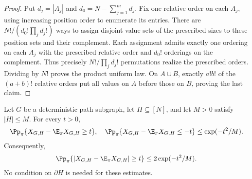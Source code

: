 \begin{proof}
Put \(d_j=|A_j|\) and \(d_0=N-\sum_{j=1}^m d_j\).  Fix one
relative order on each \(A_j\), using increasing position order to
enumerate its entries.  There are
\(N!/(d_0!\prod_jd_j!)\) ways to assign disjoint value sets of the
prescribed sizes to these position sets and their complement.  Each
assignment admits exactly one ordering on each \(A_j\) with the
prescribed relative order and \(d_0!\) orderings on the complement.
Thus precisely \(N!/\prod_jd_j!\) permutations realize the prescribed
orders.  Dividing by \(N!\) proves the product uniform law.  On
\(A\cup B\), exactly \(a!b!\) of the \((a+b)!\) relative orders
put all values on \(A\) before those on \(B\), proving the last claim.
\end{proof}

\begin{lemma}
\label{lem:permutation-bd}
Let \(G\) be a deterministic path subgraph, let \(H\subseteq[N]\),
and let \(M>0\) satisfy \(|H|\le M\).  For every \(t>0\),
\begin{equation}
\label{eq:component-ascent-one-sided}
  \Pp_\pi\{X_{G,H}-\E_\pi X_{G,H}\ge t\},\quad
  \Pp_\pi\{X_{G,H}-\E_\pi X_{G,H}\le-t\}
  \le \exp(-t^2/M).
\end{equation}
Consequently,
\[
  \Pp_\pi\{|X_{G,H}-\E_\pi X_{G,H}|\ge t\}
  \le 2\exp(-t^2/M).
\]
No condition on \(\partial H\) is needed for these estimates.
\end{lemma}

